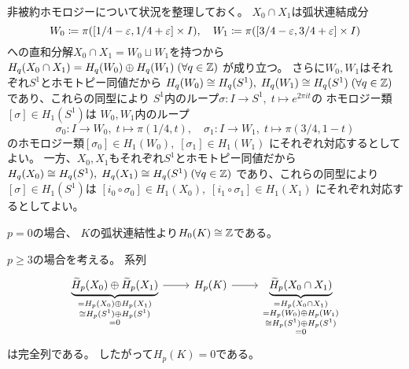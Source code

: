 \documentclass[report]{jlreq}
\begin{document}
\begin{answer}
    非被約ホモロジーについて状況を整理しておく。
    $X_0 \cap X_1$は弧状連結成分
    \begin{equation}
        W_0 \coloneqq \pi([1/4 - \varepsilon, 1/4 + \varepsilon] \times I),
        \quad
        W_1 \coloneqq \pi([3/4 - \varepsilon, 3/4 + \varepsilon] \times I)
    \end{equation}
    への直和分解$X_0 \cap X_1 = W_0 \sqcup W_1$を持つから
    $H_q(X_0 \cap X_1) = H_q(W_0) \oplus H_q(W_1) \; (\forall q \in \mathbb{Z})$
    が成り立つ。
    さらに$W_0, W_1$はそれぞれ$S^1$とホモトピー同値だから
    $H_q(W_0) \cong H_q(S^1), \;
        H_q(W_1) \cong H_q(S^1) \;
        (\forall q \in \mathbb{Z})$
    であり、これらの同型により
    $S^1$内のループ$\sigma \colon I \to S^1, \; t \mapsto e^{2\pi it}$の
    ホモロジー類$[\sigma] \in H_1(S^1)$は
    $W_0, W_1$内のループ
    \begin{equation}
        \sigma_0 \colon I \to W_0, \; t \mapsto \pi(1/4, t),
        \quad
        \sigma_1 \colon I \to W_1, \; t \mapsto \pi(3/4, 1 - t)
    \end{equation}
    のホモロジー類$[\sigma_0] \in H_1(W_0), \; [\sigma_1] \in H_1(W_1)$
    にそれぞれ対応するとしてよい。
    一方、$X_0, X_1$もそれぞれ$S^1$とホモトピー同値だから
    $H_q(X_0) \cong H_q(S^1), \;
        H_q(X_1) \cong H_q(S^1) \;
        (\forall q \in \mathbb{Z})$
    であり、これらの同型により
    $[\sigma] \in H_1(S^1)$は
    $[i_0 \circ \sigma_0] \in H_1(X_0), \; [i_1 \circ \sigma_1] \in H_1(X_1)$
    にそれぞれ対応するとしてよい。

    $p = 0$の場合、
    $K$の弧状連結性より$H_0(K) \cong \mathbb{Z}$である。

    $p \ge 3$の場合を考える。
    系列
    \begin{equation}
        \begin{tikzcd}
            \underbrace{\widetilde{H}_p(X_0) \oplus \widetilde{H}_p(X_1)}_{
                \substack{
                    = H_p(X_0) \oplus H_p(X_1) \\
                    \cong H_p(S^1) \oplus H_p(S^1) \\
                    = 0
                }
            } \ar{r}
                & H_p(K) \ar{r}
                & \underbrace{\widetilde{H}_p(X_0 \cap X_1)}_{
                    \substack{
                        = H_p(X_0 \cap X_1) \\
                        = H_p(W_0) \oplus H_p(W_1) \\
                        \cong H_p(S^1) \oplus H_p(S^1) \\
                        = 0
                    }
                }
        \end{tikzcd}
    \end{equation}
    は完全列である。
    したがって$H_p(K) = 0$である。


\end{answer}
\end{document}
